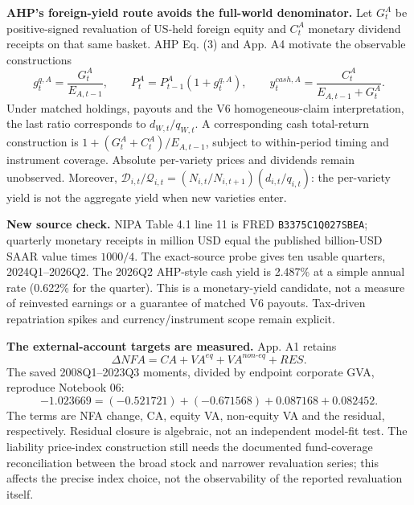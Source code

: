 \documentclass[10pt,a4paper,landscape]{article}
\newcommand{\code}[1]{{\footnotesize\texttt{#1}}}
\begin{document}
\textbf{AHP's foreign-yield route avoids the full-world denominator.} Let $G^A_t$ be positive-signed revaluation of US-held foreign equity and $C^A_t$ monetary dividend receipts on that same basket. AHP Eq. (3) and App. A4 motivate the observable constructions
\[
g^{q,A}_t=\frac{G^A_t}{E_{A,t-1}},\qquad
P^A_t=P^A_{t-1}(1+g^{q,A}_t),\qquad
y^{cash,A}_t=\frac{C^A_t}{E_{A,t-1}+G^A_t}.
\]
Under matched holdings, payouts and the V6 homogeneous-claim interpretation, the last ratio corresponds to $d_{W,t}/q_{W,t}$. A corresponding cash total-return construction is $1+(G^A_t+C^A_t)/E_{A,t-1}$, subject to within-period timing and instrument coverage. Absolute per-variety prices and dividends remain unobserved. Moreover, $\mathcal D_{i,t}/\mathcal Q_{i,t}=(N_{i,t}/N_{i,t+1})(d_{i,t}/q_{i,t})$: the per-variety yield is not the aggregate yield when new varieties enter.

\textbf{New source check.} NIPA Table 4.1 line 11 is FRED \code{B3375C1Q027SBEA}; quarterly monetary receipts in million USD equal the published billion-USD SAAR value times $1000/4$. The exact-source probe gives ten usable quarters, 2024Q1--2026Q2. The 2026Q2 AHP-style cash yield is 2.487\% at a simple annual rate (0.622\% for the quarter). This is a monetary-yield candidate, not a measure of reinvested earnings or a guarantee of matched V6 payouts. Tax-driven repatriation spikes and currency/instrument scope remain explicit.

\textbf{The external-account targets are measured.} App. A1 retains
\[
\Delta NFA=CA+VA^{eq}+VA^{non\text{-}eq}+RES.
\]
The saved 2008Q1--2023Q3 moments, divided by endpoint corporate GVA, reproduce Notebook 06:
\[
-1.023669=(-0.521721)+(-0.671568)+0.087168+0.082452.
\]
The terms are NFA change, CA, equity VA, non-equity VA and the residual, respectively. Residual closure is algebraic, not an independent model-fit test. The liability price-index construction still needs the documented fund-coverage reconciliation between the broad stock and narrower revaluation series; this affects the precise index choice, not the observability of the reported revaluation itself.



\clearpage
\end{document}
